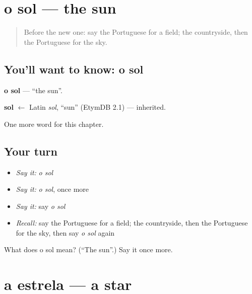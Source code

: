 \section[o sol]{o sol — the sun}

\label{lesson:PT-C58-sol}



\begin{quote}
Before the new one: say the Portuguese for a field; the countryside, then the Portuguese for the sky.
\end{quote}

\subsection*{You'll want to know: o sol}
\textbf{o sol} — \textquotedblleft{}the sun\textquotedblright{}.

\begin{cousinweb}
\textbf{sol} $\leftarrow$ Latin \emph{sol}, \textquotedblleft{}sun\textquotedblright{} (EtymDB 2.1) — inherited.
\end{cousinweb}

\begin{grammarlens}[title={What you've built}]
One more word for this chapter.
\end{grammarlens}

\subsection*{Your turn}
\begin{itemize}
\raggedright
  \item \emph{Say it:} \emph{o sol}
  \item \emph{Say it:} \emph{o sol}, once more
  \item \emph{Say it:} say \emph{o sol}
  \item \emph{Recall:} say the Portuguese for a field; the countryside, then the Portuguese for the sky, then say \emph{o sol} again
\end{itemize}

\begin{tcolorbox}[breakable,colback=teal!4,colframe=teal!35!black,title={Before you move on}]
What does o sol mean? (\textquotedblleft{}The sun\textquotedblright{}.) Say it once more.
\end{tcolorbox}
\section[a estrela]{a estrela — a star}

